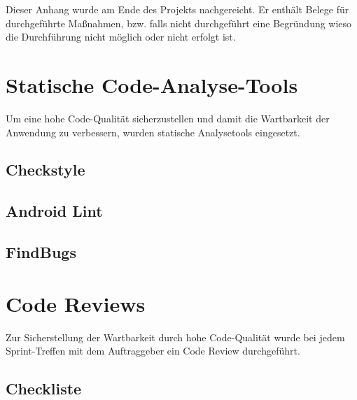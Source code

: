 
    Dieser Anhang wurde am Ende des Projekts nachgereicht. Er enthält Belege für
    durchgeführte Maßnahmen, bzw. falls nicht durchgeführt eine Begründung wieso
    die Durchführung nicht möglich oder nicht erfolgt ist. \\



\section{Statische Code-Analyse-Tools}

Um eine hohe Code-Qualität sicherzustellen und damit die Wartbarkeit der
Anwendung zu verbessern, wurden statische Analysetools eingesetzt.

\subsection{Checkstyle}



\clearpage
\subsection{Android Lint}



\clearpage
\subsection{FindBugs}



\clearpage


\section{Code Reviews}

Zur Sicherstellung der Wartbarkeit durch hohe Code-Qualität wurde bei jedem
Sprint-Treffen mit dem Auftraggeber ein Code Review durchgeführt.


\subsection{Checkliste}

